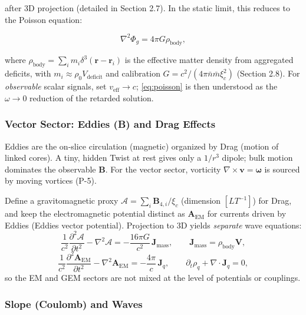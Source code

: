 after 3D projection (detailed in Section 2.7). In the static limit, this reduces to the Poisson equation:

\begin{equation}
\label{eq:poisson}
\nabla^2 \Phi_g = 4\pi G \rho_{\text{body}},
\end{equation}

where $\rho_{\text{body}} = \sum_i m_i \delta^3(\mathbf{r} - \mathbf{r}_i)$ is the effective matter density from aggregated deficits, with $m_i \approx \rho_0 V_{\text{deficit}}$ and calibration $G = c^2 / (4\pi \bar{n} \bar{m} \xi_c^2)$ (Section 2.8). For \emph{observable} scalar signals, set $v_{\text{eff}}\to c$; \eqref{eq:poisson} is then understood as the $\omega\to0$ reduction of the retarded solution.

\subsubsection{Vector Sector: Eddies (B) and Drag Effects}

Eddies are the on-slice circulation (magnetic) organized by Drag (motion of linked cores). A tiny, hidden Twist at rest gives only a $1/r^3$ dipole; bulk motion dominates the observable $\mathbf B$. For the vector sector, vorticity $\nabla \times \mathbf{v} = \boldsymbol{\omega}$ is sourced by moving vortices (P-5).

Define a gravitomagnetic proxy $\boldsymbol{\mathcal A} = \sum_i \mathbf{B}_{4,i} / \xi_c$ (dimension $[L T^{-1}]$) for Drag, and keep the electromagnetic potential distinct as $\mathbf A_{\text{EM}}$ for currents driven by Eddies (Eddies vector potential). Projection to 3D yields \emph{separate} wave equations:
\begin{equation}
\frac{1}{c^2} \frac{\partial^2 \boldsymbol{\mathcal A}}{\partial t^2} - \nabla^2 \boldsymbol{\mathcal A} = -\frac{16\pi G}{c^2}\, \mathbf{J}_{\text{mass}},\qquad
\mathbf{J}_{\text{mass}}=\rho_{\text{body}}\mathbf V,
\end{equation}
\begin{equation}
\frac{1}{c^2} \frac{\partial^2 \mathbf{A}_{\text{EM}}}{\partial t^2} - \nabla^2 \mathbf{A}_{\text{EM}} = -\frac{4\pi}{c}\, \mathbf{J}_q,\qquad
\partial_t \rho_q+\nabla\!\cdot\!\mathbf J_q=0,
\end{equation}
so the EM and GEM sectors are not mixed at the level of potentials or couplings.

\subsubsection{Slope (Coulomb) and Waves}

